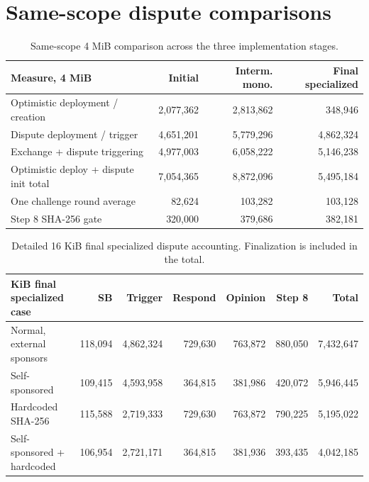 \section{Same-scope dispute comparisons}

\begin{table}[htbp]
  \centering
  \small
  \begin{tabularx}{\linewidth}{>{\raggedright\arraybackslash}Xrrr}
    \toprule
    Measure, 4 MiB & Initial & Interm. mono. & Final specialized \\
    \midrule
    Optimistic deployment / creation & 2,077,362 & 2,813,862 & 348,946 \\
    Dispute deployment / trigger & 4,651,201 & 5,779,296 & 4,862,324 \\
    Exchange + dispute triggering & 4,977,003 & 6,058,222 & 5,146,238 \\
    Optimistic deploy + dispute init total & 7,054,365 & 8,872,096 & 5,495,184 \\
    One challenge round average & 82,624 & 103,282 & 103,128 \\
    Step 8 SHA-256 gate & 320,000 & 379,686 & 382,181 \\
    \bottomrule
  \end{tabularx}
  \caption{Same-scope 4 MiB comparison across the three implementation stages.}
  \label{tab:app-4mib-comparison}
\end{table}

\begin{table}[htbp]
  \centering
  \small
  \begin{tabularx}{\linewidth}{>{\raggedright\arraybackslash}Xrrrrrr}
    \toprule
    16 KiB final specialized case & SB & Trigger & Respond & Opinion & Step 8 & Total \\
    \midrule
    Normal, external sponsors & 118,094 & 4,862,324 & 729,630 & 763,872 & 880,050 & 7,432,647 \\
    Self-sponsored & 109,415 & 4,593,958 & 364,815 & 381,986 & 420,072 & 5,946,445 \\
    Hardcoded SHA-256 & 115,588 & 2,719,333 & 729,630 & 763,872 & 790,225 & 5,195,022 \\
    Self-sponsored + hardcoded & 106,954 & 2,721,171 & 364,815 & 381,936 & 393,435 & 4,042,185 \\
    \bottomrule
  \end{tabularx}
  \caption{Detailed 16 KiB final specialized dispute accounting. Finalization is included in the total.}
  \label{tab:app-16kib-specialized}
\end{table}

